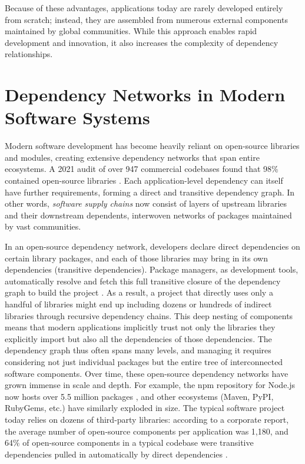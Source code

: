 \documentclass[12pt,a4paper]{report}
\begin{document}
Because of these advantages, applications today are rarely developed entirely from scratch; instead, they are assembled from numerous external components maintained by global communities. While this approach enables rapid development and innovation, it also increases the complexity of dependency relationships.

\section{Dependency Networks in Modern Software Systems}
Modern software development has become heavily reliant on open-source libraries and modules, creating extensive dependency networks that span entire ecosystems. 
A 2021 audit of over 947 commercial codebases found that 98\% contained open-source libraries \parencite{OpenSourceSecurity2026}. 
Each application-level dependency can itself have further requirements, forming a direct and transitive dependency graph. In other words, \emph{software supply chains} now consist of layers of upstream libraries and their downstream dependents, interwoven networks of packages maintained by vast communities.

In an open-source dependency network, developers declare direct dependencies on certain library packages, and each of those libraries may bring in its own dependencies (transitive dependencies). Package managers, as development tools, automatically resolve and fetch this full transitive closure of the dependency graph to build the project \parencite{boldiFineGrainedNetworkAnalysis2020}. As a result, a project that directly uses only a handful of libraries might end up including dozens or hundreds of indirect libraries through recursive dependency chains. This deep nesting of components means that modern applications implicitly trust not only the libraries they explicitly import but also all the dependencies of those dependencies. The dependency graph thus often spans many levels, and managing it requires considering not just individual packages but the entire tree of interconnected software components.
Over time, these open-source dependency networks have grown immense in scale and depth. For example, the npm repository for Node.js now hosts over 5.5 million packages \parencite{LibrariesioSecurityMaintenance2026}, and other ecosystems (Maven, PyPI, RubyGems, etc.) have similarly exploded in size. The typical software project today relies on dozens of third-party libraries: according to a corporate report, the average number of open-source components per application was 1,180, and 64\% of open-source components in a typical codebase were transitive dependencies pulled in automatically by direct dependencies \parencite{OpenSourceSecurity2026}.
\end{document}
